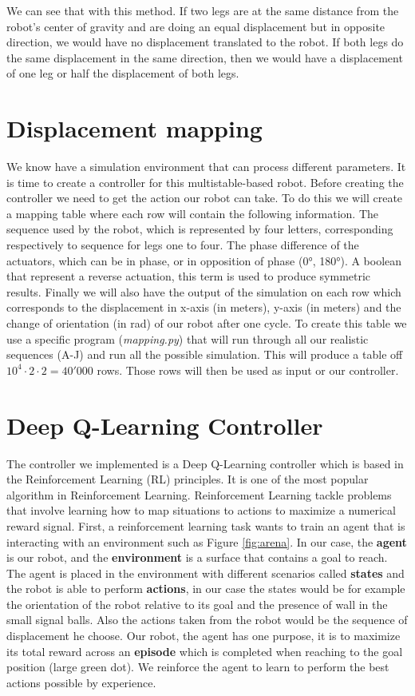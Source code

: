             We can see that with this method. If two legs are at the same distance from the robot's center of gravity and are doing an equal displacement but in opposite direction, we would have no displacement translated to the robot. If both legs do the same displacement in the same direction, then we would have a displacement of one leg or half the displacement of both legs.

    \section{Displacement mapping}
        We know have a simulation environment that can process different parameters. It is time to create a controller for this multistable-based robot. Before creating the controller we need to get the action our robot can take. To do this we will create a mapping table where each row will contain the following information. The sequence used by the robot, which is represented by four letters, corresponding respectively to sequence for legs one to four. The phase difference of the actuators, which can be in phase, or in opposition of phase (0°, 180°). A boolean that represent a reverse actuation, this term is used to produce symmetric results. Finally we will also have the output of the simulation on each row which corresponds to the displacement in x-axis (in meters), y-axis (in meters) and the change of orientation (in rad) of our robot after one cycle. 
        To create this table we use a specific program (\textit{mapping.py}) that will run through all our realistic sequences (A-J) and run all the possible simulation. This will produce a table off $10^4 \cdot 2 \cdot 2 = 40'000$ rows. Those rows will then be used as input or our controller.
        
    \section{Deep Q-Learning Controller}
        The controller we implemented is a Deep Q-Learning controller which is based in the Reinforcement Learning (RL) principles. It is one of the most popular algorithm in Reinforcement Learning. Reinforcement Learning tackle problems that involve learning how to map situations to actions to maximize a numerical reward signal\cite{sutton_barto}. First, a reinforcement learning task wants to train an agent that is interacting with an environment such as Figure \ref{fig:arena}. In our case, the \textbf{agent} is our robot, and the \textbf{environment} is a surface that contains a goal to reach. The agent is placed in the environment with different scenarios called \textbf{states} and the robot is able to perform \textbf{actions}, in our case the states would be for example the orientation of the robot relative to its goal and the presence of wall in the small signal balls. Also the actions taken from the robot would be the sequence of displacement he choose. Our robot, the agent has one purpose, it is to maximize its total reward across an \textbf{episode} which is completed when reaching to the goal position (large green dot). We reinforce the agent to learn to perform the best actions possible by experience. 
        
